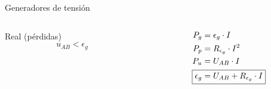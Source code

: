 \documentclass[aspectratio=169, xcolor={usenames,svgnames,dvipsnames}]{beamer}
\begin{document}
\begin{frame}{Generadores de tensión}
\begin{columns}
\begin{column}{0.3\columnwidth}
\begin{center}
\alert{Real} (pérdidas)
\begin{equation*}
    u_{AB}<\epsilon_g
\end{equation*}
\end{center}
\end{column}
\begin{column}{0.4\columnwidth}
\begin{align*}
    P_g&=\epsilon_g\cdot I\\
    P_p&=R_{\epsilon_g}\cdot I^2\\
    P_u&=U_{AB}\cdot I\\
    \Aboxed{\epsilon_g&=U_{AB}+R_{\epsilon_g}\cdot I}
\end{align*}
\end{column}
\end{columns}
\end{frame}
\end{document}
